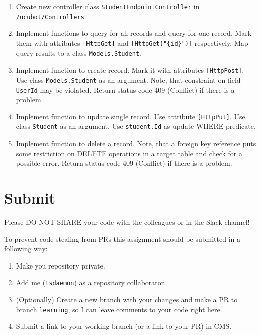 \documentclass[12pt]{article}
\newcommand{\code}[1]{\texttt{#1}}
\begin{document}
\begin{enumerate}
\item Create new controller class \code{StudentEndpointController} in \code{/ucubot/Controllers}.
\item Implement functions to query for all records and query for one record. Mark them with attributes \code{[HttpGet]} and \code{[HttpGet("\{id\}")]} respectively. Map query results to a class \code{Models.Student}.
\item Implement function to create record. Mark it with attributes \code{[HttpPost]}. Use class \code{Models.Student} as an argument. Note, that constraint on field \code{UserId} may be violated. Return status code 409 (Conflict) if there is a problem.
\item Implement function to update single record. Use attribute \code{[HttpPut]}. Use class \code{Student} as an argument. Use \code{student.Id} as update WHERE predicate.
\item Implement function to delete a record. Note, that a foreign key reference puts some restriction on DELETE operations in a target table and check for a possible error. Return status code 409 (Conflict) if there is a problem.
\end{enumerate}

\section*{Submit}

Please DO NOT SHARE your code with the colleagues or in the Slack channel!

To prevent code stealing from PRs this assignment should be submitted in a following way:
\begin{enumerate}
\item Make you repository private.
\item Add me (\code{tsdaemon}) as a repository collaborator.
\item (Optionally) Create a new branch with your changes and make a PR to branch \code{learning}, so I can leave comments to your code right here.
\item Submit a link to your working branch (or a link to your PR) in CMS.
\end{enumerate}

\clearpage
\end{document}

